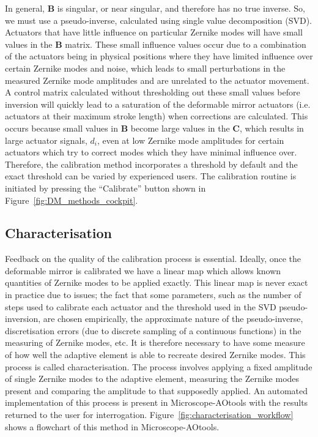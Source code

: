 In general, $\boldsymbol{B}$ is singular, or near singular, and therefore has 
no true inverse. So, we must use a pseudo-inverse, calculated using single 
value decomposition (SVD). Actuators that have little influence on particular 
Zernike modes will have small values in the $\boldsymbol{B}$ matrix. These 
small influence values occur due to a combination of the actuators being in 
physical positions where they have limited influence over certain Zernike 
modes and noise, which leads to small perturbations in the measured Zernike 
mode amplitudes and are unrelated to the actuator movement. A control matrix 
calculated without thresholding out these small values before inversion will 
quickly lead to a saturation of the deformable mirror  actuators (i.e. 
actuators at their maximum stroke length) when corrections are 
calculated\cite{booth2005methods}. This occurs because small values in 
$\boldsymbol{B}$ become large values in the $\boldsymbol{C}$, which results 
in large actuator signals, $d_{i}$, even at low Zernike mode amplitudes for 
certain actuators which try to correct modes which they have minimal 
influence over. Therefore, the calibration method incorporates a threshold by 
default and the exact threshold can be varied by experienced users. The 
calibration routine is initiated by pressing the ``Calibrate'' button shown in 
Figure~\ref{fig:DM_methods_cockpit}.

\subsection{Characterisation}
\label{subsec:characterisation}

Feedback on the quality of the calibration process is essential. Ideally, once the deformable mirror is calibrated we have a linear map which allows known quantities of Zernike modes to be applied exactly. This linear map is never exact in practice due to issues; the fact that some parameters, such as the number of steps used to calibrate each actuator and the threshold used in the SVD pseudo-inversion, are chosen empirically, the approximate nature of the pseudo-inverse, discretisation errors (due to discrete sampling of a continuous functions) in the measuring of Zernike modes, etc. It is therefore necessary to have some measure of how well the adaptive element is able to recreate desired Zernike modes. This process is called characterisation. The process involves applying a fixed amplitude of single Zernike modes to the adaptive element, measuring the Zernike modes present and comparing the amplitude to that supposedly applied. An automated implementation of this process is present in Microscope-AOtools with the results returned to the user for interrogation. Figure~\ref{fig:characterisation_workflow} shows a flowchart of this method in Microscope-AOtools. 

